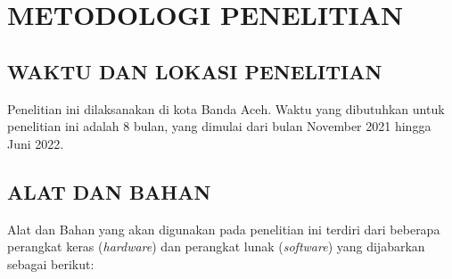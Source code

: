 \fancyhf{} 
\fancyfoot[C]{\thepage}
\chapter{METODOLOGI PENELITIAN}

\section{\uppercase{WAKTU DAN LOKASI PENELITIAN}}
Penelitian ini dilaksanakan di kota Banda Aceh. Waktu yang dibutuhkan untuk penelitian ini adalah 8 bulan, yang dimulai dari bulan November 2021 hingga Juni 2022.



\section{\uppercase{ALAT DAN BAHAN}}
Alat dan Bahan yang akan digunakan pada penelitian ini terdiri dari beberapa perangkat keras (\textit{hardware}) dan perangkat lunak (\textit{software}) yang dijabarkan sebagai berikut:


